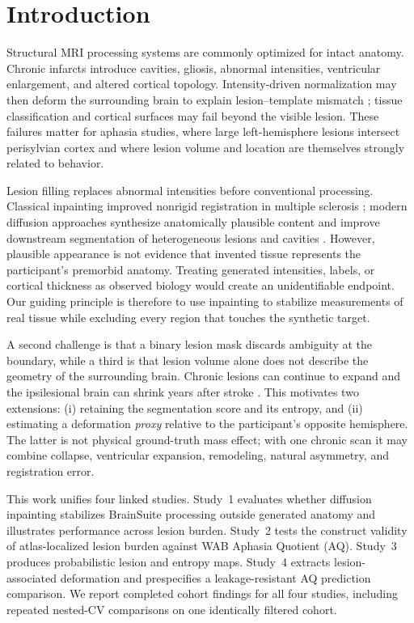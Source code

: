 \documentclass[runningheads]{llncs}
\begin{document}
\section{Introduction}
Structural MRI processing systems are commonly optimized for intact anatomy.
Chronic infarcts introduce cavities, gliosis, abnormal intensities, ventricular
enlargement, and altered cortical topology. Intensity-driven normalization may
then deform the surrounding brain to explain lesion--template mismatch
\cite{Brett2001,Andersen2010}; tissue classification and cortical surfaces may
fail beyond the visible lesion. These failures matter for aphasia studies,
where large left-hemisphere lesions intersect perisylvian cortex and where
lesion volume and location are themselves strongly related to behavior.

Lesion filling replaces abnormal intensities before conventional processing.
Classical inpainting improved nonrigid registration in multiple sclerosis
\cite{Sdika2009}; modern diffusion approaches synthesize anatomically plausible
content and improve downstream segmentation of heterogeneous lesions and
cavities \cite{Ho2020,Pollak2025}. However, plausible appearance is not evidence
that invented tissue represents the participant's premorbid anatomy. Treating
generated intensities, labels, or cortical thickness as observed biology would
create an unidentifiable endpoint. Our guiding principle is therefore to use
inpainting to stabilize measurements of real tissue while excluding every
region that touches the synthetic target.

A second challenge is that a binary lesion mask discards ambiguity at the
boundary, while a third is that lesion volume alone does not describe the
geometry of the surrounding brain. Chronic lesions can continue to expand and
the ipsilesional brain can shrink years after stroke
\cite{Seghier2014,Johnson2024}. This motivates two extensions: (i) retaining the
segmentation score and its entropy, and (ii) estimating a deformation
\emph{proxy} relative to the participant's opposite hemisphere. The latter is
not physical ground-truth mass effect; with one chronic scan it may combine
collapse, ventricular expansion, remodeling, natural asymmetry, and
registration error.

This work unifies four linked studies. Study~1 evaluates whether diffusion
inpainting stabilizes BrainSuite processing outside generated anatomy and
illustrates performance across lesion burden. Study~2 tests the
construct validity of atlas-localized lesion burden against WAB Aphasia
Quotient (AQ). Study~3 produces probabilistic lesion and entropy maps. Study~4
extracts lesion-associated deformation and prespecifies a leakage-resistant AQ
prediction comparison. We report completed cohort findings for all four
studies, including repeated nested-CV comparisons on one identically filtered
cohort.
\end{document}
